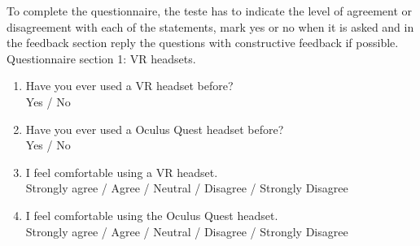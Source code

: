 To complete the questionnaire, the teste has to indicate the level of agreement or disagreement with each of the  statements, mark yes or no when it is asked and in the feedback section reply the questions with constructive feedback if possible.\\

Questionnaire section 1: VR headsets.
\begin{enumerate}
  \item Have you ever used a VR headset before?\\
  Yes / No

  \item Have you ever used a Oculus Quest headset before?\\
  Yes / No

  \item I feel comfortable using a VR headset.\\
  Strongly agree / Agree / Neutral / Disagree / Strongly Disagree

  \item I feel comfortable using the Oculus Quest headset.\\
  Strongly agree / Agree / Neutral / Disagree / Strongly Disagree\\
\end{enumerate}

